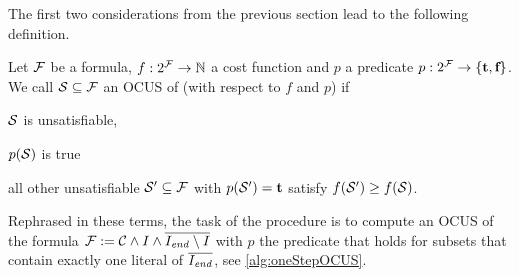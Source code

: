 The first two considerations from the previous section lead to the following definition. 

\begin{definition}
   Let $\mathcal{F} $ be a formula, $f:2^{\mathcal{F} } \to \mathbb{N}$ a cost function and  $p$ a predicate $p: 2^{\mathcal{F} }\to \{\textbf{t},\textbf{f}\}$. We call %
    $\mathcal{S} \subseteq \mathcal{F} $ an OCUS of \formula (with respect to $f$ and $p$) if \begin{compactitem}                                      
      \item $\mathcal{S}$ is unsatisfiable,
      \item $p(\mathcal{S})$ is true
      \item all other unsatisfiable $\mathcal{S}'\subseteq \mathcal{F} $ with $p(\mathcal{S}')=\textbf{t}$ satisfy $f(\mathcal{S}')\geq f(\mathcal{S})$.
    \end{compactitem}
\end{definition}

Rephrased in these terms, the task of the procedure \onestep is to compute an OCUS of the formula $\mathcal{F}  := \mathcal{C} \land I\land \overline{I_\mathit{end} \setminus I}$ with $p$ the predicate that holds for subsets  that contain exactly one literal of $\overline{I_\mathit{end} }$, see \cref{alg:oneStepOCUS}. 


